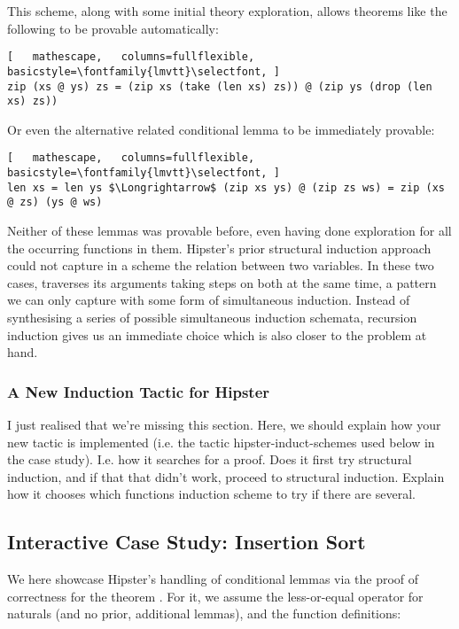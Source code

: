 \vspace{2 mm}

\noindent This scheme, along with some initial theory exploration, allows theorems like the following to be provable automatically:

\begin{lstlisting}[   mathescape,   columns=fullflexible,   basicstyle=\fontfamily{lmvtt}\selectfont, ]
zip (xs @ ys) zs = (zip xs (take (len xs) zs)) @ (zip ys (drop (len xs) zs))
\end{lstlisting}

\noindent Or even the alternative related conditional lemma to be immediately provable:

\begin{lstlisting}[   mathescape,   columns=fullflexible,   basicstyle=\fontfamily{lmvtt}\selectfont, ]
len xs = len ys $\Longrightarrow$ (zip xs ys) @ (zip zs ws) = zip (xs @ zs) (ys @ ws)
\end{lstlisting}

Neither of these lemmas was provable before, even having done exploration for all the occurring functions in them.
%
Hipster's prior structural induction approach could not capture in a scheme the relation between two variables.
%
In these two cases,  traverses its arguments taking steps on both at the same time, a pattern we can only capture with some form of simultaneous induction.
%
Instead of synthesising a series of possible simultaneous induction schemata, recursion induction gives us an immediate choice which is also closer to the problem at hand.

\subsubsection*{A New Induction Tactic for Hipster}
I just realised that we're missing this section. Here, we should explain how your new tactic is implemented (i.e. the tactic hipster-induct-schemes used below in the case study). I.e. how it searches for a proof. Does it first try structural induction, and if that that didn't work, proceed to structural induction. Explain how it chooses which functions induction scheme to try if there are several.  

\subsection{Interactive Case Study: Insertion Sort}

We here showcase Hipster's handling of conditional lemmas via the proof of correctness for the theorem .
%
For it, we assume the less-or-equal operator \isaCode{$\le$} for naturals (and no prior, additional lemmas), and the function definitions:

